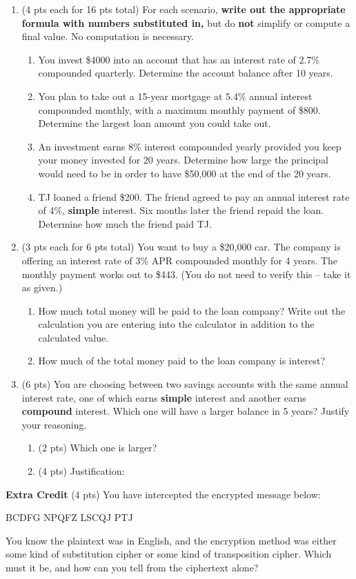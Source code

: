 \documentclass[12pt]{article}
\renewcommand{\emph}[1]{\textsf{\textbf{#1}}}
\begin{document}
\begin{enumerate}
\item (4 pts each for 16 pts total) For each scenario, \emph{write out the appropriate formula with numbers substituted in,} but do \emph{not} simplify or compute a final value. No computation is necessary.
	\begin{enumerate}
	\item You invest \$4000 into an account that has an interest rate of 2.7\% compounded quarterly. Determine the account balance after 10 years.
	\vfill
	\item You plan to take out a 15-year mortgage at 5.4\% annual interest compounded monthly, with a maximum monthly payment of \$800. Determine the largest loan amount you could take out.
	\vfill
	\item An investment earns 8\% interest compounded yearly provided you keep your money invested for 20 years. Determine how large the principal would need to be in order to have \$50,000 at the end of the 20 years.
	\vfill
	\item TJ loaned a friend \$200. The friend agreed to pay an annual interest rate of 4\%, \emph{simple} interest. Six months later the friend repaid the loan. Determine how much the friend paid TJ.
	\vfill
	\end{enumerate}
	\newpage
\item (3 pts each for 6 pts total) You want to buy a \$20,000 car. The company is offering an interest rate of 3\% APR compounded monthly for 4 years. The monthly payment works out to \$443. (You do not need to verify this -- take it as given.)
		\begin{enumerate}
		\item How much total money will be paid to the loan company? Write out the calculation you are entering into the calculator in addition to the calculated value.		
		\vfill
		\item How much of the total money paid to the loan company is interest?
		\vfill
		\end{enumerate}

\item (6 pts) You are choosing between two savings accounts with the same annual interest rate, one of which earns \emph{simple} interest and another earns \textbf{compound} interest. Which one will have a larger balance in 5 years? Justify your reasoning.
	\begin{enumerate}
	\item (2 pts) Which one is larger?
	\vspace{.5in}
	 \item (4 pts) Justification:
	 \vfill
	 \end{enumerate}
\end{enumerate}
\newpage
\textbf{Extra Credit} (4 pts) You have intercepted the encrypted message below: 
\begin{center} \textsf{BCDFG \quad NPQFZ \quad LSCQJ \quad PTJ} \end{center} You know the plaintext was in English, and the encryption method was either some kind of substitution cipher or some kind of transposition cipher. Which must it be, and how can you tell from the ciphertext alone?
\end{document}

